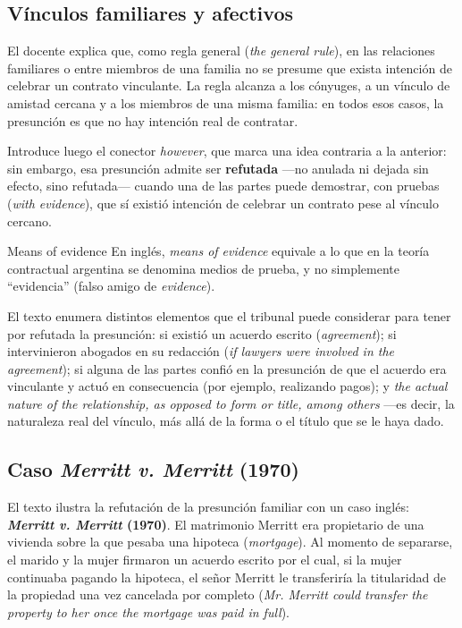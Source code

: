 \documentclass[12pt,oneside]{book}
\begin{document}
\subsection{Vínculos familiares y afectivos}

El docente explica que, como regla general (\textit{the general rule}), en las relaciones familiares o entre miembros de una familia no se presume que exista intención de celebrar un contrato vinculante. La regla alcanza a los cónyuges, a un vínculo de amistad cercana y a los miembros de una misma familia: en todos esos casos, la presunción es que no hay intención real de contratar.

Introduce luego el conector \textit{however}, que marca una idea contraria a la anterior: sin embargo, esa presunción admite ser \textbf{refutada} —no anulada ni dejada sin efecto, sino refutada— cuando una de las partes puede demostrar, con pruebas (\textit{with evidence}), que sí existió intención de celebrar un contrato pese al vínculo cercano.

\begin{definition}{Means of evidence}
En inglés, \textit{means of evidence} equivale a lo que en la teoría contractual argentina se denomina medios de prueba, y no simplemente ``evidencia'' (falso amigo de \textit{evidence}).
\end{definition}

El texto enumera distintos elementos que el tribunal puede considerar para tener por refutada la presunción: si existió un acuerdo escrito (\textit{agreement}); si intervinieron abogados en su redacción (\textit{if lawyers were involved in the agreement}); si alguna de las partes confió en la presunción de que el acuerdo era vinculante y actuó en consecuencia (por ejemplo, realizando pagos); y \textit{the actual nature of the relationship, as opposed to form or title, among others} —es decir, la naturaleza real del vínculo, más allá de la forma o el título que se le haya dado.

\subsection{Caso \textit{Merritt v. Merritt} (1970)}

El texto ilustra la refutación de la presunción familiar con un caso inglés: \textbf{\textit{Merritt v. Merritt} (1970)}. El matrimonio Merritt era propietario de una vivienda sobre la que pesaba una hipoteca (\textit{mortgage}). Al momento de separarse, el marido y la mujer firmaron un acuerdo escrito por el cual, si la mujer continuaba pagando la hipoteca, el señor Merritt le transferiría la titularidad de la propiedad una vez cancelada por completo (\textit{Mr. Merritt could transfer the property to her once the mortgage was paid in full}).
\end{document}
